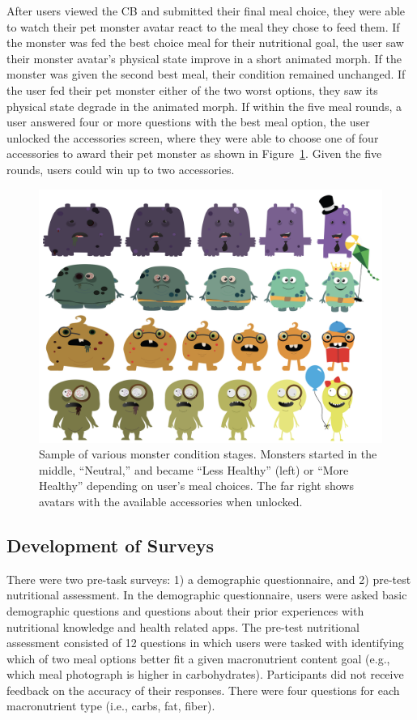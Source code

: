 After users viewed the CB and submitted their final meal choice,
they were able to watch their pet monster avatar react to the meal they chose to feed them. 
If the monster was fed the best choice meal for their nutritional goal, the user saw their monster avatar's physical state improve in a short animated morph. If the monster was given the second best meal, their condition remained unchanged. 
If the user fed their pet monster either of the two worst options, they saw its physical state degrade in the animated morph. If within the five meal rounds, a user answered four or more questions with the best meal option, the user unlocked the accessories screen, where they were able to choose one of four accessories to award their pet monster as shown in Figure~\ref{fig:monster-stages}. 
Given the five rounds, users could win up to two accessories.

\begin{figure}[h]
\includegraphics[scale=0.25]{samples/images/figure-5.png}
\caption{Sample of various monster condition stages. Monsters started in the middle, ``Neutral,'' and became ``Less Healthy'' (left) or ``More Healthy'' depending on user's meal choices. The far right shows avatars with the available accessories when unlocked.}
\label{fig:monster-stages}
\end{figure}



\vspace{-5pt}
\subsection{Development of Surveys}
There were two pre-task surveys: 1) a demographic questionnaire, and 2) pre-test nutritional assessment.
In the demographic questionnaire, users were asked basic demographic questions and questions about their prior experiences with nutritional knowledge and health related apps. The pre-test nutritional assessment consisted of 12 questions in which users were tasked with identifying which of two meal options better fit a given macronutrient content goal (e.g., which meal photograph is higher in carbohydrates). 
Participants did not receive feedback on the accuracy of their responses. 
There were four questions for each macronutrient type (i.e., carbs, fat, fiber). 

